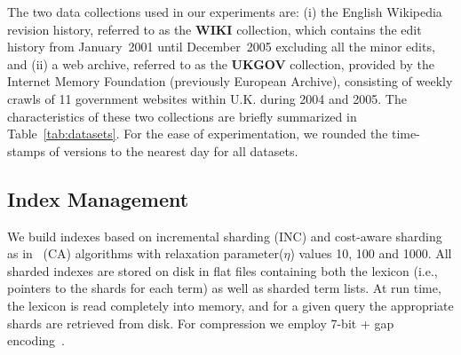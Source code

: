 



The two data collections used in our experiments are: (i) the English
Wikipedia revision history, referred to as the {\bf WIKI} collection,
which contains the edit history from January~2001 until December~2005
excluding all the minor edits, and (ii) a web archive, referred to as
the {\bf UKGOV} collection, provided by the Internet Memory Foundation
(previously European Archive), consisting of weekly crawls
of 11 government websites within U.K. during 2004 and 2005. The
characteristics of these two collections are briefly summarized in
Table~\ref{tab:datasets}. For the ease of experimentation, we rounded
the time-stamps of versions to the nearest day for all datasets.


\subsection{Index Management}

We build indexes based on incremental sharding (INC) and cost-aware sharding as in~\cite{aanand:sigir2011} (CA) algorithms with relaxation
parameter($\eta$) values 10, 100 and 1000.  All sharded indexes are stored on disk
in flat files containing both the lexicon (i.e., pointers to the
shards for each term) as well as sharded term lists. At run time, the
lexicon is read completely into memory, and for a given query the
appropriate shards are retrieved from disk. For compression we employ
7-bit + gap encoding~\cite{manning:2008}.


